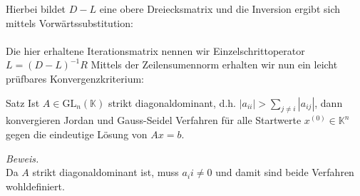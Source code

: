 \documentclass{article}
\begin{document}
Hierbei bildet $D-L$ eine obere Dreiecksmatrix und die Inversion ergibt sich mittels Vorwärtssubstitution: \\ \\
Die hier erhaltene Iterationsmatrix nennen wir Einzelschrittoperator $L=(D-L)^{-1}R$
Mittels der Zeilensumennorm erhalten wir nun ein leicht prüfbares Konvergenzkriterium:
\begin{thmbox}{Satz}
    Ist $A\in\text{GL}_n(\mathbb{K})$ strikt diagonaldominant, d.h. $|a_{ii}| > \sum_{j\neq i} |a_{ij}|$, 
    dann konvergieren Jordan und Gauss-Seidel Verfahren für alle Startwerte $x^{(0)}\in\mathbb{K}^n$ gegen 
    die eindeutige Lösung von $Ax=b$.
\end{thmbox}
\textit{Beweis.} \\
Da $A$ strikt diagonaldominant ist, muss $a_ii \neq 0$ und damit sind beide Verfahren wohldefiniert.
\end{document}
